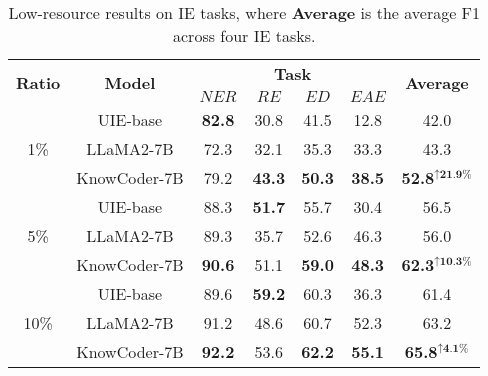 \begin{table}
  \centering
  \setlength\tabcolsep{2.3pt}  %
  \resizebox{1\linewidth}{!}
  {
  \begin{tabular}{@{}c|c|cccc|c@{}}
  \toprule
  \multirow{2}{*}{\textbf{Ratio}} & \multirow{2}{*}{\textbf{Model}} & \multicolumn{4}{c|}{\textbf{Task}} & \multirow{2}{*}{\textbf{Average}} \\
  \cmidrule{3-6}
  
  &       & ${NER}$   & ${RE}$   & ${ED}$  & ${EAE}$  &            \\ 
      \midrule
  \multirow{3}{*}{1\%}   & UIE-base                    &   \textbf{82.8}    &   30.8   &  41.5   &   12.8   &    42.0                  \\
  
  & LLaMA2-7B              &    72.3   &    32.1     &   35.3  &   33.3  &    43.3                  \\
         
  & KnowCoder-7B           &    79.2   &    \textbf{43.3}     &   \textbf{50.3}  &  \textbf{38.5}  &     \textbf{52.8$^{\uparrow\textbf{21.9\%}}$}                 \\ 
  
  \midrule
                         
  \multirow{3}{*}{5\%}   & UIE-base                   &   88.3    &    \textbf{51.7}   &  55.7   &   30.4  &            56.5            \\
  
  & LLaMA2-7B              &   89.3    &    35.7     &   52.6  &   46.3  &    56.0                \\
  
  & KnowCoder-7B           &   \textbf{90.6}    &    51.1     &   \textbf{59.0}  &   \textbf{48.3} &      \textbf{62.3$^{\uparrow\textbf{10.3\%}}$}               \\ 
     
  \midrule
  
  \multirow{3}{*}{10\%}  & UIE-base                 &   89.6    &   \textbf{59.2}   &   60.3  &    36.3  &          61.4            \\
  
  & LLaMA2-7B              &   91.2    &    48.6     &   60.7  &   52.3 &      63.2                \\
  
  & KnowCoder-7B           &   \textbf{92.2}    &    53.6     &   \textbf{62.2}  &   \textbf{55.1} &      \textbf{65.8$^{\uparrow\textbf{4.1\%}}$}                \\ 
  
  \bottomrule
  \end{tabular}
  }
  \caption{
      Low-resource results on IE tasks, where \textbf{Average} is the average F1 across four IE tasks.
  }
  \label{tab:lowresource}
  \vspace{-3mm}
\end{table}


